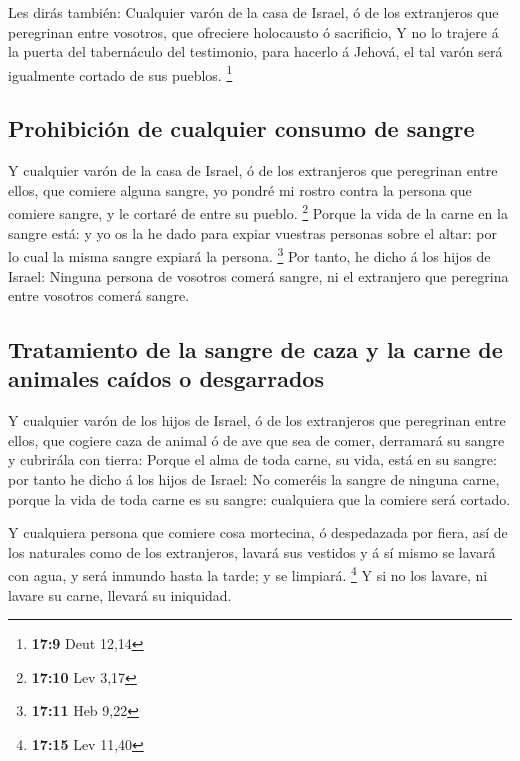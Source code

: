  Les dirás también: Cualquier varón de la casa de Israel, ó
de los extranjeros que peregrinan entre vosotros, que ofreciere
holocausto ó sacrificio,  Y no lo trajere á la puerta del
tabernáculo del testimonio, para hacerlo á Jehová, el tal varón será
igualmente cortado de sus pueblos. \footnote{\textbf{17:9} Deut 12,14}

\hypertarget{prohibiciuxf3n-de-cualquier-consumo-de-sangre}{%
\subsection{Prohibición de cualquier consumo de
sangre}\label{prohibiciuxf3n-de-cualquier-consumo-de-sangre}}

 Y cualquier varón de la casa de Israel, ó de los
extranjeros que peregrinan entre ellos, que comiere alguna sangre, yo
pondré mi rostro contra la persona que comiere sangre, y le cortaré de
entre su pueblo. \footnote{\textbf{17:10} Lev 3,17}  Porque
la vida de la carne en la sangre está: y yo os la he dado para expiar
vuestras personas sobre el altar: por lo cual la misma sangre expiará la
persona. \footnote{\textbf{17:11} Heb 9,22}  Por tanto, he
dicho á los hijos de Israel: Ninguna persona de vosotros comerá sangre,
ni el extranjero que peregrina entre vosotros comerá sangre.

\hypertarget{tratamiento-de-la-sangre-de-caza-y-la-carne-de-animales-cauxeddos-o-desgarrados}{%
\subsection{Tratamiento de la sangre de caza y la carne de animales
caídos o
desgarrados}\label{tratamiento-de-la-sangre-de-caza-y-la-carne-de-animales-cauxeddos-o-desgarrados}}

 Y cualquier varón de los hijos de Israel, ó de los
extranjeros que peregrinan entre ellos, que cogiere caza de animal ó de
ave que sea de comer, derramará su sangre y cubrirála con tierra:
 Porque el alma de toda carne, su vida, está en su sangre:
por tanto he dicho á los hijos de Israel: No comeréis la sangre de
ninguna carne, porque la vida de toda carne es su sangre: cualquiera que
la comiere será cortado.

 Y cualquiera persona que comiere cosa mortecina, ó
despedazada por fiera, así de los naturales como de los extranjeros,
lavará sus vestidos y á sí mismo se lavará con agua, y será inmundo
hasta la tarde; y se limpiará. \footnote{\textbf{17:15} Lev 11,40}
 Y si no los lavare, ni lavare su carne, llevará su
iniquidad.

